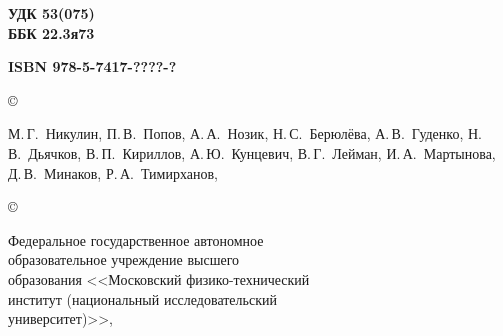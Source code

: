 {\footnotesize
\hfill\parbox{2cm}{\bfseries УДК 53(075)\\
ББК 22.3я73\par}

\vskip 4mm


\settowidth{\vva}{\footnotesize\bf ISBN 978-5-7417-0507-0 (Т.\tom)}%
\noindent
\parbox[t]{\vva}{\footnotesize\bf
ISBN 978-5-7417-????-?}
\setlength{\vvc}{\textwidth}%
\addtolength{\vvc}{-0.97\vva}%
\setlength{\vvb}{2.5em}%
\addtolength{\vvc}{-\vvb}%
\hfill
\copyright~\parbox[t]{\vvc}{%
\strut
М.\,Г.~Никулин,
П.\,В.~Попов,
А.\,А.~Нозик,
Н.\,С.~Берюлёва,
А.\,В.~Гуденко,
Н.\,В.~Дьячков,
В.\,П.~Кириллов,
А.\,Ю.~Кунцевич,
В.\,Г.~Лейман,
И.\,А.~Мартынова,
Д.\,В.~Минаков,
Р.\,А.~Тимирханов,
\god}

\smallskip

\hfill
\copyright~\parbox[t]{\vvc}{\raggedright
Федеральное государственное автономное\\
образовательное учреждение высшего\\
образования <<Московский физико-технический\\
институт (национальный исследовательский\\
университет)>>, \god}



}
